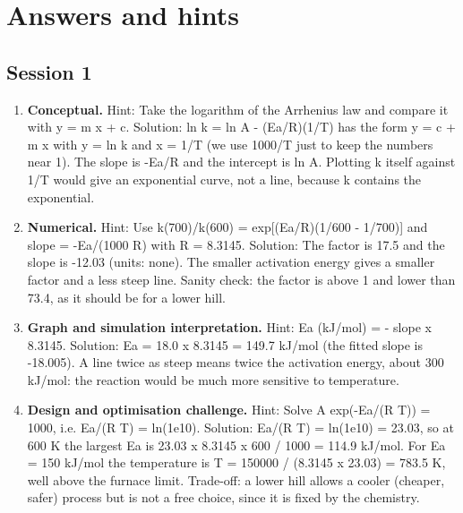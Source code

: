 \documentclass[11pt,a4paper]{article}
\begin{document}
\section{Answers and hints}

\subsection*{Session 1}
\begin{enumerate}[nosep]
\item \textbf{Conceptual.} Hint: Take the logarithm of the Arrhenius law and compare it with y = m x + c. Solution: ln k = ln A - (Ea/R)(1/T) has the form y = c + m x with y = ln k and x = 1/T (we use 1000/T just to keep the numbers near 1). The slope is -Ea/R and the intercept is ln A. Plotting k itself against 1/T would give an exponential curve, not a line, because k contains the exponential.
\item \textbf{Numerical.} Hint: Use k(700)/k(600) = exp[(Ea/R)(1/600 - 1/700)] and slope = -Ea/(1000 R) with R = 8.3145. Solution: The factor is 17.5 and the slope is -12.03 (units: none). The smaller activation energy gives a smaller factor and a less steep line. Sanity check: the factor is above 1 and lower than 73.4, as it should be for a lower hill.
\item \textbf{Graph and simulation interpretation.} Hint: Ea (kJ/mol) = - slope x 8.3145. Solution: Ea = 18.0 x 8.3145 = 149.7 kJ/mol (the fitted slope is -18.005). A line twice as steep means twice the activation energy, about 300 kJ/mol: the reaction would be much more sensitive to temperature.
\item \textbf{Design and optimisation challenge.} Hint: Solve A exp(-Ea/(R T)) = 1000, i.e. Ea/(R T) = ln(1e10). Solution: Ea/(R T) = ln(1e10) = 23.03, so at 600 K the largest Ea is 23.03 x 8.3145 x 600 / 1000 = 114.9 kJ/mol. For Ea = 150 kJ/mol the temperature is T = 150000 / (8.3145 x 23.03) = 783.5 K, well above the furnace limit. Trade-off: a lower hill allows a cooler (cheaper, safer) process but is not a free choice, since it is fixed by the chemistry.
\end{enumerate}
\end{document}
